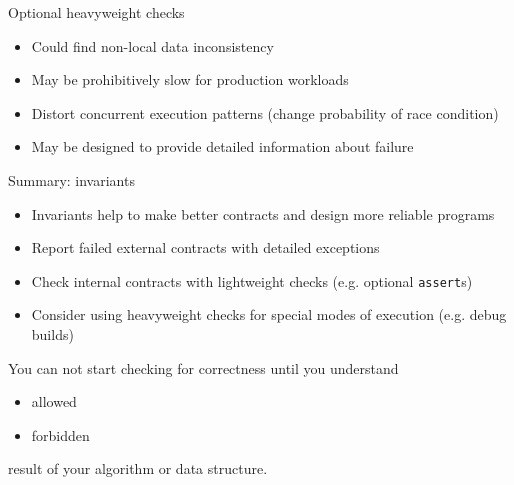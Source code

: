 \begin{frame}[t]{Optional heavyweight checks}

\begin{itemize}
  \item Could find non-local data inconsistency
  \item May be prohibitively slow for production workloads
  \item Distort concurrent execution patterns (change probability of race condition)
  \item May be designed to provide detailed information about failure
\end{itemize}
\end{frame}


\begin{frame}[t]{Summary: invariants}

\begin{itemize}
  \item Invariants help to make better contracts and design more reliable programs
  \item Report failed external contracts with detailed exceptions
  \item Check internal contracts with lightweight checks (e.g. optional \texttt{assert}s)
  \item Consider using heavyweight checks for special modes of execution (e.g. debug builds)
\end{itemize}

\pause

You can not start checking for correctness until you understand 
\begin{itemize}
  \item allowed
  \item forbidden
\end{itemize}
result of your algorithm or data structure.
\end{frame}


